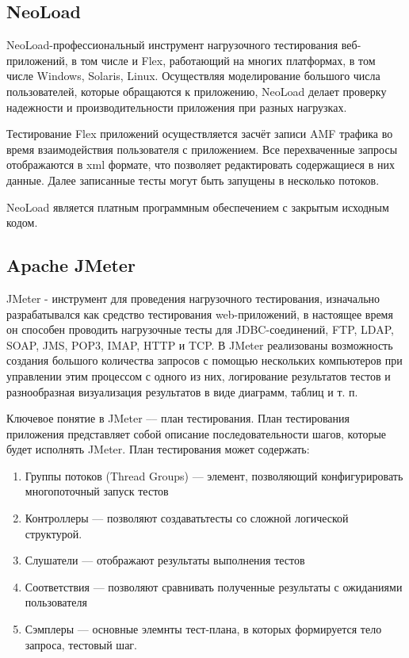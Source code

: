 \subsection{NeoLoad}

NeoLoad-профессиональный инструмент нагрузочного тестирования веб-приложений, 
в том числе и Flex, работающий на многих платформах, в том числе Windows, Solaris, Linux.
Осуществляя моделирование большого числа пользователей, которые обращаются 
к приложению, NeoLoad делает проверку надежности и производительности 
приложения при разных нагрузках.

Тестирование Flex приложений осуществляется засчёт записи AMF трафика во 
время взаимодействия пользователя с приложением. Все перехваченные запросы 
отображаются в xml формате, что позволяет редактировать содержащиеся в них 
данные. Далее записанные тесты могут быть запущены в несколько потоков.

NeoLoad является платным программным обеспечением с закрытым исходным кодом. 
 
\subsection{Apache JMeter}

JMeter - инструмент для проведения нагрузочного тестирования, изначально 
разрабатывался как средство тестирования web-приложений, в настоящее время 
он способен проводить нагрузочные тесты для JDBC-соединений, FTP, LDAP, SOAP, 
JMS, POP3, IMAP, HTTP и TCP. 
В JMeter реализованы возможность создания большого количества запросов с 
помощью нескольких компьютеров при управлении этим процессом с одного из них,
логирование результатов тестов и разнообразная визуализация результатов в
виде диаграмм, таблиц и т. п.

Ключевое понятие в JMeter –-- план тестирования. План тестирования приложения
представляет собой описание последовательности шагов, которые
будет исполнять JMeter. План тестирования может содержать:

\begin{enumerate}
\item Группы потоков (Thread Groups) --- элемент, позволяющий конфигурировать
многопоточный запуск тестов
\item Контроллеры --- позволяют создаватьтесты со сложной логической структурой.
\item Слушатели --- отображают результаты выполнения тестов
\item Соответствия --- позволяют сравнивать полученные результаты с
ожиданиями пользователя
\item Сэмплеры --- основные элемнты тест-плана, в которых формируется тело
запроса, тестовый шаг.
\end{enumerate}

